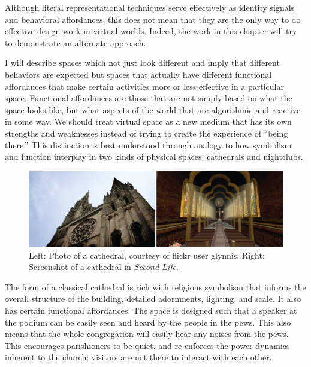 Although literal representational techniques serve effectively as identity signals and behavioral affordances, this does not mean that they are the only way to do effective design work in virtual worlds. Indeed, the work in this chapter will try to demonstrate an alternate approach.

I will describe spaces which not just look different and imply that different behaviors are expected but spaces that actually have different functional affordances that make certain activities more or less effective in a particular space. Functional affordances are those that are not simply based on what the space looks like, but what aspects of the world that are algorithmic and reactive in some way. We should treat virtual space as a new medium that has its own strengths and weaknesses instead of trying to create the experience of ``being there.'' This distinction is best understood through analogy to how symbolism and function interplay in two kinds of physical spaces: cathedrals and nightclubs.

\begin{figure}[t]
	\includegraphics{figures/cathedral_comparison.png}
	\caption{Left: Photo of a cathedral, courtesy of flickr user glynnis. Right: Screenshot of a cathedral in \emph{Second Life}.}
	\label{fig:cathedral_comparison}
\end{figure}

The form of a classical cathedral is rich with religious symbolism that informs the overall structure of the building, detailed adornments, lighting, and scale. It also has certain functional affordances. The space is designed such that a speaker at the podium can be easily seen and heard by the people in the pews. This also means that the whole congregation will easily hear any noises from the pews. This encourages parishioners to be quiet, and re-enforces the power dynamics inherent to the church; visitors are not there to interact with each other.

